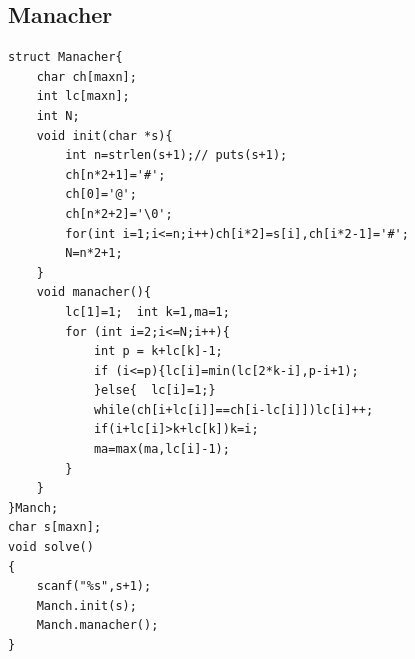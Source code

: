 \documentclass[12pt, a4paper, oneside]{ctexart}
\begin{document}
\newpage
\subsection{Manacher} 
\begin{lstlisting}
struct Manacher{
	char ch[maxn];
	int lc[maxn];
	int N;
	void init(char *s){
		int n=strlen(s+1);// puts(s+1);
		ch[n*2+1]='#';
		ch[0]='@';
		ch[n*2+2]='\0';
		for(int i=1;i<=n;i++)ch[i*2]=s[i],ch[i*2-1]='#';
		N=n*2+1;
	}
	void manacher(){
		lc[1]=1;  int k=1,ma=1;
		for (int i=2;i<=N;i++){
			int p = k+lc[k]-1;
			if (i<=p){lc[i]=min(lc[2*k-i],p-i+1);
			}else{	lc[i]=1;}
			while(ch[i+lc[i]]==ch[i-lc[i]])lc[i]++;
			if(i+lc[i]>k+lc[k])k=i;
			ma=max(ma,lc[i]-1);
		}
	}
}Manch;
char s[maxn];
void solve()
{
	scanf("%s",s+1);
	Manch.init(s);
	Manch.manacher();
}

\end{lstlisting}




\newpage
\end{document}
